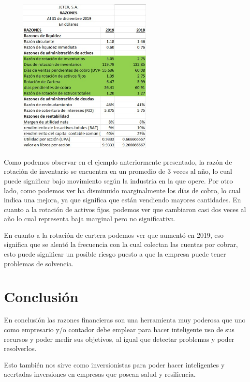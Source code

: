 \documentclass{article}
\begin{document}
\begin{figure}
    \begin{center}
        \includegraphics[width=0.6\textwidth]{rf1.jpeg}
    \end{center}
\end{figure}
Como podemos observar en el ejemplo anteriormente presentado, la razón de rotación de inventario se encuentra en un promedio de 3 veces al año, lo cual puede significar bajo movimiento según la industria en la que opere. Por otro lado, como podemos ver ha disminuido marginalmente los días de cobro, lo cual indica una mejora, ya que significa que están vendiendo mayores cantidades. 
En cuanto a la rotación de activos fijos, podemos ver que cambiaron casi dos veces al año lo cual representa baja marginal pero no significativa. 
\par 
En cuanto a la rotación de cartera podemos ver que aumentó en 2019, eso significa que se alentó la frecuencia con la cual colectan las cuentas por cobrar, esto puede significar un posible riesgo puesto a que la empresa puede tener problemas de solvencia. \par 


\section{Conclusión}
En conclusión las razones financieras son una herramienta muy poderosa que uno como empresario y/o contador debe emplear para hacer inteligente uso de sus recursos y poder medir sus objetivos, al igual que detectar problemas y poder resolverlos. \par Esto también nos sirve como inversionistas para poder hacer inteligentes y acertadas inversiones en empresas que posean salud y resiliencia.
\end{document}
